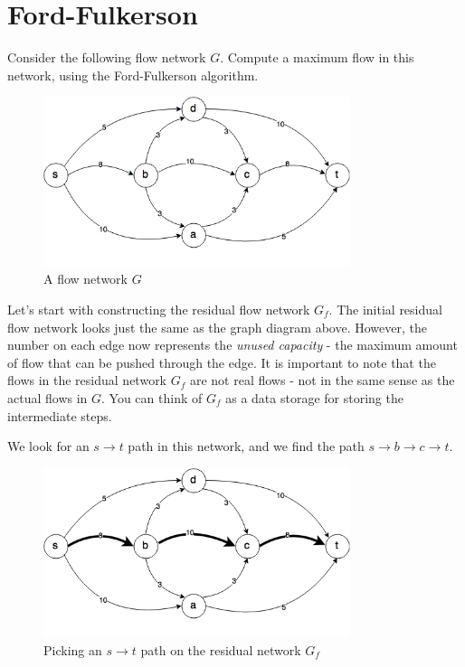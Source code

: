 \documentclass{article}
\begin{document}
\section{Ford-Fulkerson}
Consider the following flow network $G$.
Compute a maximum flow in this network, using the Ford-Fulkerson
algorithm.

\begin{figure}[H]
\centering
\includegraphics[width=0.8\textwidth]{g_0.png}
\caption{A flow network $G$}
\end{figure}

Let's start with constructing the residual flow network $G_f$.
The initial residual flow network looks just the same as the graph diagram
above. However, the number on each edge now represents the {\it unused
capacity} - the maximum amount of flow that can be pushed through the edge.
It is important to note that the flows in the residual network $G_f$ are not
real flows - not in the same sense as the actual flows in $G$.
You can think of $G_f$ as a data storage for storing the intermediate steps.

We look for an $s \rightarrow t$ path in this network, and
we find the path $s \rightarrow b \rightarrow c \rightarrow t$.

\begin{figure}[H]
\centering
\includegraphics[width=0.8\textwidth]{gf_0.png}
\caption{Picking an $s \rightarrow t$ path on the residual network $G_f$}
\end{figure}
\end{document}
